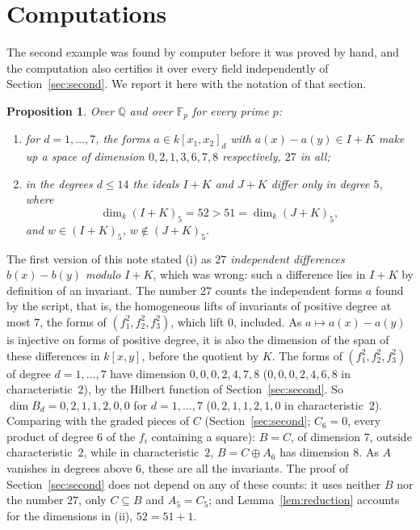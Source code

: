 \documentclass[11pt,a4paper]{amsart}
\newtheorem{proposition}[theorem]{Proposition}
\theoremstyle{remark}
\newcommand{\F}{\mathbb F}
\newcommand{\Q}{\mathbb Q}
\begin{document}
\section{Computations}\label{sec:comp}

The second example was found by computer before it was proved by hand, and the computation also certifies it over every field independently of Section~\ref{sec:second}. We report it here with the notation of that section.

\begin{proposition}\label{prop:dims}
Over $\Q$ and over $\F_p$ for every prime $p$:
\begin{enumerate}
\item for $d = 1, \dots, 7$, the forms $a \in k[x_1, x_2]_d$ with $a(x) - a(y) \in I + K$ make up a space of dimension $0, 2, 1, 3, 6, 7, 8$ respectively, $27$ in all;
\item in the degrees $d \le 14$ the ideals $I + K$ and $J + K$ differ only in degree $5$, where
\[
\dim_k (I + K)_5 = 52 > 51 = \dim_k (J + K)_5,
\]
and $w \in (I + K)_5$, $w \notin (J + K)_5$.
\end{enumerate}
\end{proposition}

The first version of this note stated (i) as \emph{$27$ independent differences $b(x) - b(y)$ modulo $I + K$}, which was wrong: such a difference lies in $I + K$ by definition of an invariant. The number $27$ counts the independent forms $a$ found by the script, that is, the homogeneous lifts of invariants of positive degree at most $7$, the forms of $(f_1^2, f_2^2, f_3^2)$, which lift $0$, included. As $a \mapsto a(x) - a(y)$ is injective on forms of positive degree, it is also the dimension of the span of these differences in $k[x, y]$, before the quotient by $K$. The forms of $(f_1^2, f_2^2, f_3^2)$ of degree $d = 1, \dots, 7$ have dimension $0, 0, 0, 2, 4, 7, 8$ ($0, 0, 0, 2, 4, 6, 8$ in characteristic~$2$), by the Hilbert function of Section~\ref{sec:second}. So $\dim B_d = 0, 2, 1, 1, 2, 0, 0$ for $d = 1, \dots, 7$ ($0, 2, 1, 1, 2, 1, 0$ in characteristic~$2$). Comparing with the graded pieces of $C$ (Section~\ref{sec:second}; $C_6 = 0$, every product of degree $6$ of the $f_i$ containing a square): $B = C$, of dimension $7$, outside characteristic~$2$, while in characteristic~$2$, $B = C \oplus A_6$ has dimension $8$. As $A$ vanishes in degrees above $6$, these are all the invariants. The proof of Section~\ref{sec:second} does not depend on any of these counts: it uses neither $B$ nor the number $27$, only $C \subseteq B$ and $A_5 = C_5$; and Lemma~\ref{lem:reduction} accounts for the dimensions in (ii), $52 = 51 + 1$.
\end{document}
